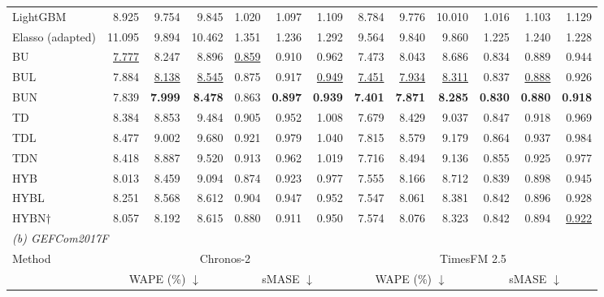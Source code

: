 \begin{table}[!htbp]
\begin{tabular*}{\textwidth}{@{\extracolsep{\fill}}l*{12}{r}@{}}
LightGBM & 8.925 & 9.754 & 9.845 & 1.020 & 1.097 & 1.109 & 8.784 & 9.776 & 10.010 & 1.016 & 1.103 & 1.129 \\
Elasso (adapted) & 11.095 & 9.894 & 10.462 & 1.351 & 1.236 & 1.292 & 9.564 & 9.840 & 9.860 & 1.225 & 1.240 & 1.228 \\
\midrule
BU & \cellcolor{accuracysecond}\underline{7.777} & 8.247 & 8.896 & \cellcolor{accuracysecond}\underline{0.859} & 0.910 & 0.962 & 7.473 & 8.043 & 8.686 & 0.834 & 0.889 & 0.944 \\
BUL & 7.884 & \cellcolor{accuracysecond}\underline{8.138} & \cellcolor{accuracysecond}\underline{8.545} & 0.875 & 0.917 & \cellcolor{accuracysecond}\underline{0.949} & \cellcolor{accuracysecond}\underline{7.451} & \cellcolor{accuracysecond}\underline{7.934} & \cellcolor{accuracysecond}\underline{8.311} & 0.837 & \cellcolor{accuracysecond}\underline{0.888} & 0.926 \\
BUN & 7.839 & \cellcolor{accuracybest}\textbf{7.999} & \cellcolor{accuracybest}\textbf{8.478} & 0.863 & \cellcolor{accuracybest}\textbf{0.897} & \cellcolor{accuracybest}\textbf{0.939} & \cellcolor{accuracybest}\textbf{7.401} & \cellcolor{accuracybest}\textbf{7.871} & \cellcolor{accuracybest}\textbf{8.285} & \cellcolor{accuracybest}\textbf{0.830} & \cellcolor{accuracybest}\textbf{0.880} & \cellcolor{accuracybest}\textbf{0.918} \\
TD & 8.384 & 8.853 & 9.484 & 0.905 & 0.952 & 1.008 & 7.679 & 8.429 & 9.037 & 0.847 & 0.918 & 0.969 \\
TDL & 8.477 & 9.002 & 9.680 & 0.921 & 0.979 & 1.040 & 7.815 & 8.579 & 9.179 & 0.864 & 0.937 & 0.984 \\
TDN & 8.418 & 8.887 & 9.520 & 0.913 & 0.962 & 1.019 & 7.716 & 8.494 & 9.136 & 0.855 & 0.925 & 0.977 \\
HYB & 8.013 & 8.459 & 9.094 & 0.874 & 0.923 & 0.977 & 7.555 & 8.166 & 8.712 & 0.839 & 0.898 & 0.945 \\
HYBL & 8.251 & 8.568 & 8.612 & 0.904 & 0.947 & 0.952 & 7.547 & 8.061 & 8.381 & 0.842 & 0.896 & 0.928 \\
HYBN$\dagger$ & 8.057 & 8.192 & 8.615 & 0.880 & 0.911 & 0.950 & 7.574 & 8.076 & 8.323 & 0.842 & 0.894 & \cellcolor{accuracysecond}\underline{0.922} \\
\midrule
\multicolumn{13}{l}{\textit{(b) GEFCom2017F}} \\
Method & \multicolumn{6}{c}{Chronos-2} & \multicolumn{6}{c}{TimesFM 2.5} \\
\cmidrule(lr){2-7}\cmidrule(l){8-13}
 & \multicolumn{3}{c}{WAPE (\%) $\downarrow$} & \multicolumn{3}{c}{sMASE $\downarrow$} & \multicolumn{3}{c}{WAPE (\%) $\downarrow$} & \multicolumn{3}{c}{sMASE $\downarrow$} \\

\end{tabular*}
\end{table}
